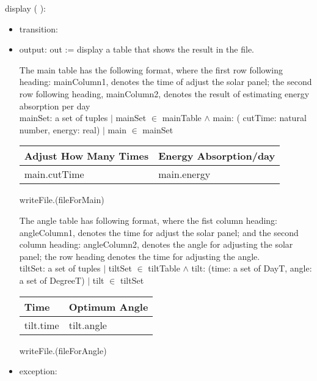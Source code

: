 \documentclass[12pt, titlepage]{article}
\begin{document}
\noindent  display ( ):
\begin{itemize}
\item transition:
\item output: out := display a table that shows the result in the file.

The main table has the following format, where the first row following heading: mainColumn1, denotes the time of adjust the solar panel; the second row following heading, mainColumn2, denotes the result of estimating energy absorption per day\\

mainSet: a set of tuples $|$ mainSet $\in$ mainTable $\wedge$ main: ( 
cutTime: natural number, energy: real) $|$ main $\in$ mainSet\\


\begin{center}
\begin{tabular}{|p{5cm}|p{5cm}|}

\hline 
Adjust How Many Times & Energy Absorption/day \\
\hline 
main.cutTime & main.energy    \\
\hline 
\end{tabular}
\end{center}

writeFile.(fileForMain)


The angle table has following format,  where the fist column heading: angleColumn1, denotes the time for adjust the solar panel; and the second column heading: angleColumn2, denotes the angle for adjusting the solar panel; the row heading denotes the time for adjusting the angle.\\


tiltSet: a set of tuples $|$ tiltSet $\in$ tiltTable $\wedge$ tilt: (time: a set of DayT,  angle: a set of DegreeT)  $|$ tilt $\in$ tiltSet \ \\

\begin{center}
\begin{tabular}{|p{4.5cm}|p{4cm}|}

\hline 
  Time & Optimum Angle   \\
\hline 
tilt.time & tilt.angle \\
\hline 
\end{tabular}
\end{center}
writeFile.(fileForAngle)

\item exception: 
\end{itemize}
\end{document}
